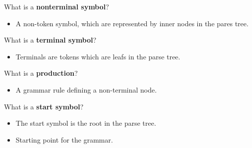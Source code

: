 \documentclass[11pt]{beamer}
\begin{document}
\begin{frame}

\begin{block}{What is a \textbf{nonterminal symbol}?}
\begin{itemize}
\item A non-token symbol, which are represented by inner nodes in the pares tree.
\end{itemize}
\end{block}

\begin{block}{What is a \textbf{terminal symbol}?}
\begin{itemize}
\item Terminals are tokens which are leafs in the parse tree.
\end{itemize}
\end{block}

\begin{block}{What is a \textbf{production}?}
\begin{itemize}
\item A grammar rule defining a non-terminal node.
\end{itemize}
\end{block}

\begin{block}{What is a \textbf{start symbol}?}
\begin{itemize}
\item The start symbol is the root in the parse tree.
\item Starting point for the grammar.
\end{itemize}
\end{block}

\end{frame}
\end{document}
